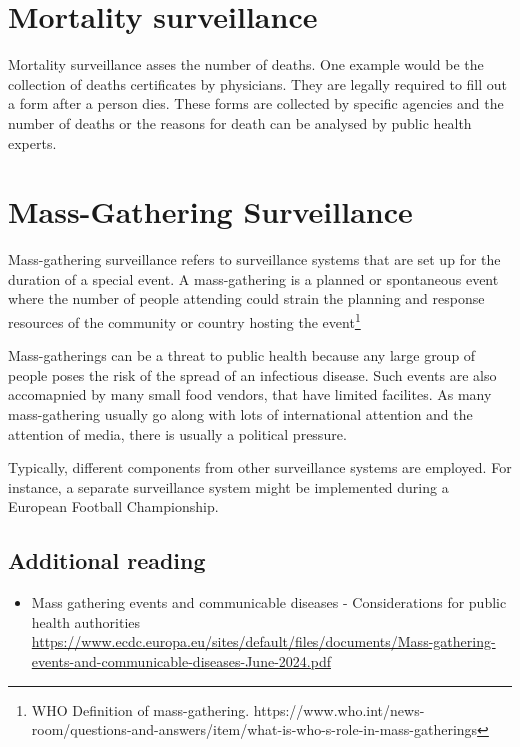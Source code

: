 \documentclass[
  letterpaper,
  DIV=11,
  numbers=noendperiod]{scrreprt}
\providecommand{\tightlist}{%
  \setlength{\itemsep}{0pt}\setlength{\parskip}{0pt}}\usepackage{longtable,booktabs,array}
\begin{document}
\chapter{Mortality surveillance}\label{mortality-surveillance}

Mortality surveillance asses the number of deaths. One example would be
the collection of deaths certificates by physicians. They are legally
required to fill out a form after a person dies. These forms are
collected by specific agencies and the number of deaths or the reasons
for death can be analysed by public health experts.

\chapter{Mass-Gathering Surveillance}\label{mass-gathering-surveillance}

Mass-gathering surveillance refers to surveillance systems that are set
up for the duration of a special event. A mass-gathering is a planned or
spontaneous event where the number of people attending could strain the
planning and response resources of the community or country hosting the
event\footnote{WHO Definition of mass-gathering.
  https://www.who.int/news-room/questions-and-answers/item/what-is-who-s-role-in-mass-gatherings}

Mass-gatherings can be a threat to public health because any large group
of people poses the risk of the spread of an infectious disease. Such
events are also accomapnied by many small food vendors, that have
limited facilites. As many mass-gathering usually go along with lots of
international attention and the attention of media, there is usually a
political pressure.

Typically, different components from other surveillance systems are
employed. For instance, a separate surveillance system might be
implemented during a European Football Championship.

\section{Additional reading}\label{additional-reading}

\begin{itemize}
\tightlist
\item
  Mass gathering events and communicable diseases - Considerations for
  public health authorities
  \url{https://www.ecdc.europa.eu/sites/default/files/documents/Mass-gathering-events-and-communicable-diseases-June-2024.pdf}
\end{itemize}
\end{document}
